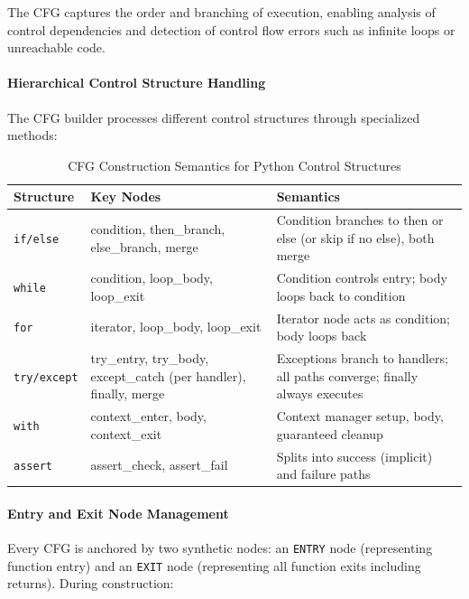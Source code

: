 The CFG captures the order and branching of execution, enabling analysis of control dependencies and detection of control flow errors such as infinite loops or unreachable code.

\paragraph{Hierarchical Control Structure Handling}

The CFG builder processes different control structures through specialized methods:

\begin{table}[htbp]
    \centering
    \small
    \begin{tabular}{|l|l|p{5cm}|}
    \hline
    \textbf{Structure} & \textbf{Key Nodes} & \textbf{Semantics} \\
    \hline
    \texttt{if/else} & condition, then\_branch, else\_branch, merge & Condition branches to then or else (or skip if no else), both merge \\
    \hline
    \texttt{while} & condition, loop\_body, loop\_exit & Condition controls entry; body loops back to condition \\
    \hline
    \texttt{for} & iterator, loop\_body, loop\_exit & Iterator node acts as condition; body loops back \\
    \hline
    \texttt{try/except} & try\_entry, try\_body, except\_catch (per handler), finally, merge & Exceptions branch to handlers; all paths converge; finally always executes \\
    \hline
    \texttt{with} & context\_enter, body, context\_exit & Context manager setup, body, guaranteed cleanup \\
    \hline
    \texttt{assert} & assert\_check, assert\_fail & Splits into success (implicit) and failure paths \\
    \hline
    \end{tabular}
    \caption{CFG Construction Semantics for Python Control Structures}
    \label{tab:cfg_semantics}
\end{table}

\paragraph{Entry and Exit Node Management}

Every CFG is anchored by two synthetic nodes: an \texttt{ENTRY} node (representing function entry) and an \texttt{EXIT} node (representing all function exits including returns). During construction:

